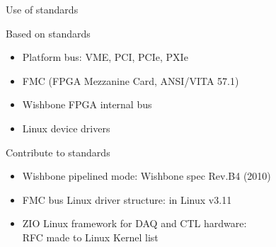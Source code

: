 \documentclass[compress,red]{beamer}
\begin{document}

\begin{frame}{Use of standards}

  \begin{block}{Based on standards}
    \begin{itemize}
    \item Platform bus: VME, PCI, PCIe, PXIe
    \item FMC (FPGA Mezzanine Card, ANSI/VITA 57.1)
    \item Wishbone FPGA internal bus
    \item Linux device drivers
    \end{itemize}
  \end{block}

  \begin{block}{Contribute to standards}
    \begin{itemize}
    \item Wishbone pipelined mode: Wishbone spec Rev.B4 (2010)
    \item FMC bus Linux driver structure: in Linux v3.11
    \item ZIO Linux framework for DAQ and CTL hardware: \\ RFC made to Linux Kernel list
    \end{itemize}
  \end{block}


\end{frame}
\end{document}
